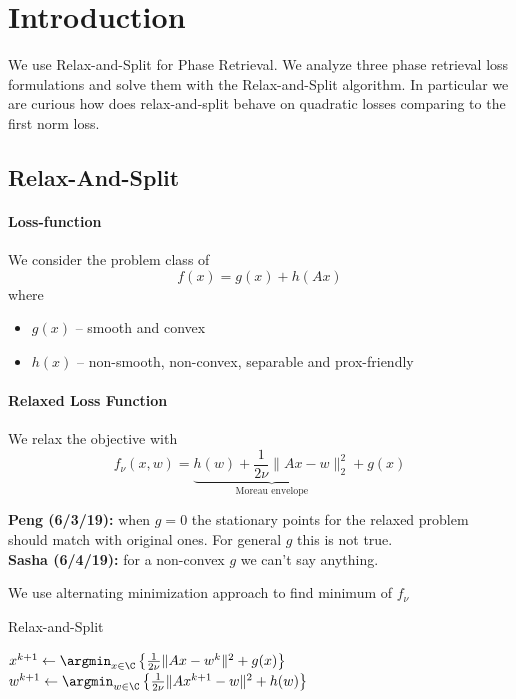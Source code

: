 \documentclass[11pt,letterpaper]{article}
\newcommand{\Peng}[1]{\textbf{Peng (#1):}}
\newcommand{\Sasha}[1]{\textbf{Sasha (#1):}}
\numberwithin{equation}{section} %
\numberwithin{figure}{section} %
\numberwithin{table}{section} %
\begin{document}
\newpage

\section{Introduction} 
We use Relax-and-Split for Phase Retrieval. We analyze three phase retrieval loss formulations and solve them with the Relax-and-Split algorithm. In particular we are curious how does relax-and-split behave on quadratic losses comparing to the first norm loss. 


\subsection*{Relax-And-Split}
    \paragraph{Loss-function} We consider the problem class of
    \[
        f(x) = g(x) + h(Ax)
    \]
    where 
    \begin{itemize}
        \item $g(x)$ -- smooth and convex 
        \item $h(x)$ -- non-smooth, non-convex, separable and prox-friendly 
    \end{itemize}
    
    \paragraph{Relaxed Loss Function}
    We relax the objective with 
    \[
        f_{\nu}(x, w) = \underbrace{h(w) + \frac{1}{2\nu}\|Ax - w\|_2^2}_{\text{Moreau envelope}} + g(x)
    \]
    
    \begin{tip} \Peng{6/3/19} when $g = 0$ the stationary points for the relaxed problem should match with original ones. For general $g$ this is not true. \\
        \Sasha{6/4/19} for a non-convex $g$ we can't say anything. 
    \end{tip}

    
    We use alternating minimization approach to find minimum of $f_{\nu}$
    
    \begin{algorithm}
        \caption{Relax-and-Split \cite{Zheng2018RelaxAndSplit}}
        \label{alg:relax-and-split}
        \begin{algorithmic}[1]
            \State $x^{k+1} \gets \argmin_{x \in \C} \left\{\frac{1}{2\nu}\|Ax - w^k\|^2 + g(x)\right\}$
            \State $w^{k+1} \gets \argmin_{w \in \C} \left\{\frac{1}{2\nu}\|Ax^{k+1} - w\|^2 + h(w)\right\} $
        \end{algorithmic}
    \end{algorithm}
\end{document}

